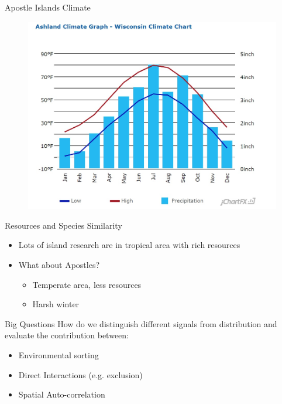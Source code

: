 \documentclass{beamer}
\begin{document}
\begin{frame}{Apostle Islands Climate} %
	\begin{figure}[ht]
		\centering
		\includegraphics[scale=.6]{fig/APIS/climate.jpg}
		\label{climate}
	\end{figure}
\end{frame}

\begin{frame}{Resources and Species Similarity}
	\begin{itemize}
		\item Lots of island research are in tropical area with rich resources
		\item What about Apostles?\pause
		\begin{itemize}
			\item Temperate area, less resources
			\item Harsh winter 
		\end{itemize}
	\end{itemize}
\end{frame}

\begin{frame}{Big Questions}
	How do we distinguish different signals from distribution and evaluate the contribution between:
	\begin{itemize}
		\item Environmental sorting
		\item Direct Interactions (e.g. exclusion)
		\item Spatial Auto-correlation 
	\end{itemize}
\end{frame}
\end{document}
